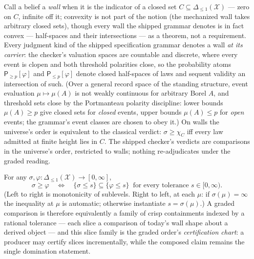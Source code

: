 \begin{proposition}
\label{prop:su-restriction}
Call a belief a \emph{wall} when it is the indicator of a
closed set $C \subseteq \Delta_{\le 1}(\mathcal{X})$ --- zero
on $C$, infinite off it; convexity is not part of the notion (the
mechanized wall takes arbitrary closed sets), though every wall the
shipped grammar denotes is in fact convex --- half-spaces and their
intersections --- as a theorem, not a requirement. Every judgment kind of the shipped
specification grammar denotes a wall \emph{at its carrier}: the
checker's valuation spaces are countable and discrete, where every
event is clopen and both threshold polarities close, so the
probability atoms $\mathsf{P}_{\ge p}[\varphi]$ and
$\mathsf{P}_{\le p}[\varphi]$ denote closed half-spaces of laws
and sequent validity an intersection of such. (Over a
general record space of the standing structure, event evaluation
$\mu \mapsto \mu(A)$ is not weakly continuous for arbitrary Borel
$A$, and threshold sets close by the Portmanteau polarity
discipline: lower bounds $\mu(A) \ge p$ give closed sets for
\emph{closed} events, upper bounds $\mu(A) \le p$ for \emph{open}
events; the grammar's event classes are chosen to obey it.) On
walls the universe's order is equivalent to the classical verdict:
$\sigma \ge \chi_C$ iff every law admitted at finite
height lies in $C$. The shipped checker's verdicts are comparisons
in the universe's order, restricted to walls; nothing
re-adjudicates under the graded reading.
\end{proposition}

\begin{proposition}
\label{prop:su-bridge}
For any $\sigma, \varphi \colon \Delta_{\le 1}(\mathcal{X}) \to
[0,\infty]$,
\[
  \sigma \ge \varphi
  \quad\Longleftrightarrow\quad
  \{\sigma \le s\} \subseteq \{\varphi \le s\}
  \ \text{ for every tolerance } s \in [0,\infty).
\]
(Left to right is monotonicity of sublevels. Right to left, at each
$\mu$: if $\sigma(\mu) = \infty$ the inequality at $\mu$ is
automatic; otherwise instantiate $s = \sigma(\mu)$.) A graded
comparison is therefore
equivalently a family of crisp containments indexed by a rational
tolerance --- each slice a comparison of today's wall shape about a
derived object --- and this slice family is the graded order's
\emph{certification chart}: a producer may certify slices
incrementally, while the composed claim remains the single
domination statement.
\end{proposition}

